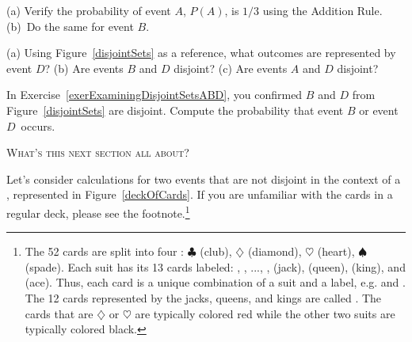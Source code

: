 \documentclass{ccg-topic}
\begin{document}
\begin{todo}
(a) Verify the probability of event $A$, $P(A)$,
is $1/3$ using the Addition Rule.
(b)~Do the same for event $B$.\footnotemark
\end{todo}

\begin{todo} \label{exerExaminingDisjointSetsABD}
(a) Using Figure~\ref{disjointSets} as a reference, what outcomes are represented by event $D$? (b) Are events $B$ and $D$ disjoint? (c) Are events $A$ and $D$ disjoint?\footnotemark
\end{todo}

\begin{todo}
In Exercise~\ref{exerExaminingDisjointSetsABD}, you confirmed $B$ and $D$ from Figure~\ref{disjointSets} are disjoint. Compute the probability that event $B$ or event $D$~occurs.\footnotemark
\end{todo}




\vspace{1em}\noindent\textsc{What's this next section all about?} 
\vspace{1em}

Let's consider calculations for two events that are not disjoint in the context of a , represented in Figure~\ref{deckOfCards}. If you are unfamiliar with the cards in a regular deck, please see the footnote.\footnote{The 52 cards are split into four : $\clubsuit$ (club), {\color{red}$\diamondsuit$} (diamond), {\color{red}$\heartsuit$} (heart), $\spadesuit$ (spade). Each suit has its 13 cards labeled: , , ..., ,  (jack),  (queen),  (king), and  (ace). Thus, each card is a unique combination of a suit and a label, e.g. {\color{red}} and . The 12 cards represented by the jacks, queens, and kings are called . The cards that are {\color{red}$\diamondsuit$} or {\color{red}$\heartsuit$} are typically colored {\color{red}red} while the other two suits are typically colored black.}
\end{document}
